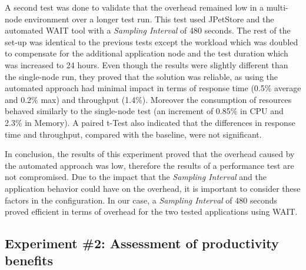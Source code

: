 \documentclass[runningheads,a4paper]{llncs}
\newcommand{\myspaceM}{-7.6pt}
\begin{document}
A second test was done to validate that the overhead remained low in a
multi-node environment over a longer test run. This test used JPetStore and the
automated WAIT tool with a \emph{Sampling Interval} of 480 seconds. The rest of
the set-up was identical to the previous tests except the workload which was doubled
to compensate for the additional application node and the test duration which
was increased to 24 hours. Even though the results were slightly different than the
single-node run, they proved that the solution was reliable, as using the
automated approach had minimal impact in terms of response time (0.5\% 
average and 0.2\% max) and throughput (1.4\%). Moreover the consumption
of resources behaved similarly to the single-node test (an increment of 0.85\%
in CPU and 2.3\% in Memory). A paired t-Test also indicated that the
differences in response time and throughput, compared with the baseline, were
not significant.

In conclusion, the results of this experiment proved that the
overhead caused by the automated approach was low, therefore the results of a
performance test are not compromised. Due to the impact that the \emph{Sampling
Interval} and the application behavior could have on the overhead, it is important to 
consider these factors in the configuration. In our case, a \emph{Sampling
Interval} of 480 seconds proved efficient in terms of overhead for the two tested applications using WAIT.

\vspace{\myspaceM{}}
\subsection{Experiment \#2: Assessment of productivity benefits}
\label{Experiment_2_Results}
\vspace{\myspaceM{}}

\end{document}

